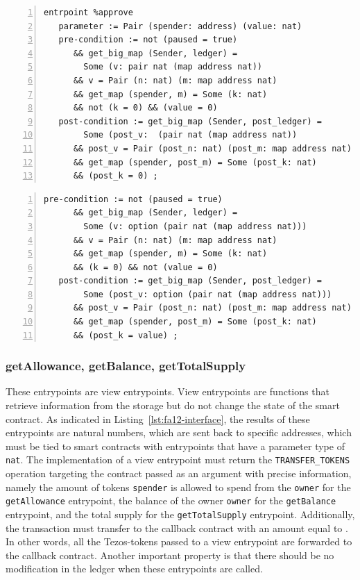 \documentclass[a4paper,USenglish,cleveref, autoref,anonymous]{lipics-v2021}
\begin{document}
\begin{lstlisting}[float=tp,captionpos=b,caption={Specification of the \lstinline/approve/ entrypoint (Property 1)},label={lst:specification-approve-1},numbers=left]
entrpoint %approve
   parameter := Pair (spender: address) (value: nat)
   pre-condition := not (paused = true)
      && get_big_map (Sender, ledger) = 
        Some (v: pair nat (map address nat))
      && v = Pair (n: nat) (m: map address nat) 
      && get_map (spender, m) = Some (k: nat) 
      && not (k = 0) && (value = 0)
   post-condition := get_big_map (Sender, post_ledger) = 
        Some (post_v:  (pair nat (map address nat))
      && post_v = Pair (post_n: nat) (post_m: map address nat) 
      && get_map (spender, post_m) = Some (post_k: nat) 
      && (post_k = 0) ;
\end{lstlisting}
\begin{lstlisting}[float=tp,captionpos=b,caption={Specification of the \lstinline/approve/ entrypoint (Property 2)},label={lst:specification-approve-2},numbers=left]
   pre-condition := not (paused = true) 
      && get_big_map (Sender, ledger) = 
        Some (v: option (pair nat (map address nat))) 
      && v = Pair (n: nat) (m: map address nat) 
      && get_map (spender, m) = Some (k: nat) 
      && (k = 0) && not (value = 0)
   post-condition := get_big_map (Sender, post_ledger) = 
        Some (post_v: option (pair nat (map address nat))) 
      && post_v = Pair (post_n: nat) (post_m: map address nat) 
      && get_map (spender, post_m) = Some (post_k: nat) 
      && (post_k = value) ;
\end{lstlisting}

\subsubsection{getAllowance, getBalance,  getTotalSupply}
\label{sec:getall-getb-gett}

These entrypoints are view entrypoints. View entrypoints are functions
that retrieve information from the storage but do not change the state
of the smart contract. As indicated in
Listing~\ref{lst:fa12-interface}, the results of these entrypoints are
natural numbers, which are sent back to specific addresses, which must
be tied to smart contracts with entrypoints that have a parameter type
of \lstinline/nat/. The implementation of a view entrypoint must
return the \lstinline/TRANSFER_TOKENS/ operation targeting the
contract passed as an argument with precise information, namely the
amount of tokens \lstinline/spender/ is allowed to spend from the
\lstinline/owner/ for the \lstinline/getAllowance/ entrypoint, the
balance of the owner \lstinline/owner/ for the \lstinline/getBalance/
entrypoint, and the total supply for the \lstinline/getTotalSupply/
entrypoint. Additionally, the transaction must transfer to the
callback contract with an amount equal to \AMOUNT. In other words, all
the Tezos-tokens passed to a view entrypoint are forwarded to the
callback contract. Another important property is that there should be
no modification in the ledger when these entrypoints are called. 
\end{document}
